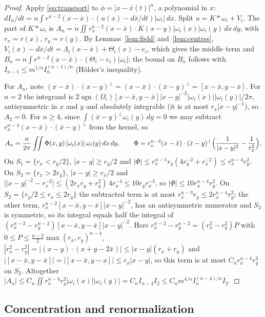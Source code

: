 \documentclass[11pt]{article}
\theoremstyle{definition}
\begin{document}
\begin{proof}
Apply \eqref{eq:transport} to $\phi = |x - \bar x(t)|^n$, a polynomial in $x$: $dI_n/dt = n\int r^{n-2}(x - \bar x)\cdot(u(x) - d\bar x/dt)|\omega_i|\,dx$. Split $u = K*\omega_i + V_i$. The part of $K*\omega_i$ is $A_n = n\iint r_x^{n-2}(x - \bar x)\cdot K(x - y)|\omega_i(x)|\omega_i(y)\,dx\,dy$, with $r_x = r(x)$, $r_y = r(y)$. By Lemmas~\ref{lem:field} and~\ref{lem:centres}, $V_i(x) - d\bar x/dt = \Lambda_i(x - \bar x) + \Theta_i(x) - e_i$, which gives the middle term and $B_n = n\int r^{n-2}(x - \bar x)\cdot(\Theta_i - e_i)|\omega_i|$; the bound on $B_n$ follows with $I_{n-1} \le m^{1/n}I_n^{(n-1)/n}$ (H\"older's inequality).

For $A_n$, note $(x - \bar x)\cdot(x - y)^\perp = (x - \bar x)\cdot(\bar x - y)^\perp = [x - \bar x, y - \bar x]$. For $n = 2$ the integrand is $2\operatorname{sgn}(\Omega_i)[x - \bar x, y - \bar x]|x - y|^{-2}|\omega_i(x)||\omega_i(y)|/2\pi$, antisymmetric in $x$ and $y$ and absolutely integrable (it is at most $r_x|x - y|^{-1}$), so $A_2 = 0$. For $n \ge 4$, since $\int(\bar x - y)^\perp\omega_i(y)\,dy = 0$ we may subtract $r_x^{n-4}(x - \bar x)\cdot(\bar x - y)^\perp$ from the kernel, so
\[
  A_n = \frac{n}{2\pi}\iint\Phi(x, y)\,|\omega_i(x)|\,\omega_i(y)\,dx\,dy,\qquad \Phi = r_x^{n-2}(x - \bar x)\cdot(\bar x - y)^\perp\Bigl(\frac1{|x - y|^2} - \frac1{r_x^2}\Bigr).
\]
On $S_1 = \{r_x < r_y/2\}$, $|x - y| \ge r_y/2$ and $|\Phi| \le r_x^{n-1}r_y(4r_y^{-2} + r_x^{-2}) \le r_x^{n-4}r_y^2$. On $S_3 = \{r_x > 2r_y\}$, $|x - y| \ge r_x/2$ and $\bigl||x - y|^{-2} - r_x^{-2}\bigr| \le (2r_xr_y + r_y^2)\,4r_x^{-4} \le 10r_yr_x^{-3}$, so $|\Phi| \le 10r_x^{n-4}r_y^2$. On $S_2 = \{r_y/2 \le r_x \le 2r_y\}$ the subtracted term is at most $r_x^{n-3}r_y \le 2r_x^{n-4}r_y^2$; the other term, $r_x^{n-2}[x - \bar x, y - \bar x]|x - y|^{-2}$, has an antisymmetric numerator and $S_2$ is symmetric, so its integral equals half the integral of $(r_x^{n-2} - r_y^{n-2})[x - \bar x, y - \bar x]|x - y|^{-2}$. Here $r_x^{n-2} - r_y^{n-2} = (r_x^2 - r_y^2)P$ with $0 \le P \le \frac{n-2}{2}\max(r_x, r_y)^{n-4}$, $|r_x^2 - r_y^2| = |(x - y)\cdot(x + y - 2\bar x)| \le |x - y|(r_x + r_y)$ and $|[x - \bar x, y - \bar x]| = |[x - \bar x, y - x]| \le r_x|x - y|$, so this term is at most $C_nr_x^{n-4}r_y^2$ on $S_2$. Altogether $|A_n| \le C_n\iint r_x^{n-4}r_y^2|\omega_i(x)||\omega_i(y)| = C_nI_{n-4}I_2 \le C_nm^{4/n}I_n^{(n-4)/n}I_2$.
\end{proof}

\subsection{Concentration and renormalization}
\end{document}
